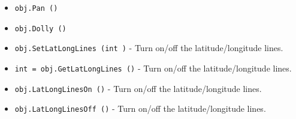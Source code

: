 \begin{itemize}
\item  \verb|obj.Pan ()|

\item  \verb|obj.Dolly ()|

\item  \verb|obj.SetLatLongLines (int )| -  Turn on/off the latitude/longitude lines.

\item  \verb|int = obj.GetLatLongLines ()| -  Turn on/off the latitude/longitude lines.

\item  \verb|obj.LatLongLinesOn ()| -  Turn on/off the latitude/longitude lines.

\item  \verb|obj.LatLongLinesOff ()| -  Turn on/off the latitude/longitude lines.

\end{itemize}
